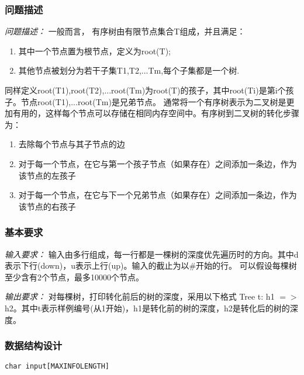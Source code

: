 \documentclass[a4paper,11pt]{article}%
\newenvironment{shadedquotation}
 {\begin{shaded*}
  \quoting[leftmargin=0pt, vskip=0pt]
 }
 {\endquoting
 \end{shaded*}
}
\begin{document}
\subsubsection{问题描述}
\begin{shadedquotation}
    \emph{问题描述：}
    一般而言， 有序树由有限节点集合T组成，并且满足：
    \begin{enumerate}
        \item 其中一个节点置为根节点，定义为root(T);
        \item 其他节点被划分为若干子集T1,T2,...Tm,每个子集都是一个树.
    \end{enumerate}
同样定义root(T1),root(T2),...root(Tm)为root(T)的孩子，其中root(Ti)是第i个孩子。节点root(T1),...root(Tm)是兄弟节点。
通常将一个有序树表示为二叉树是更加有用的，这样每个节点可以存储在相同内存空间中。有序树到二叉树的转化步骤为：
\begin{enumerate}
    \item 去除每个节点与其子节点的边
    \item 对于每一个节点，在它与第一个孩子节点（如果存在）之间添加一条边，作为该节点的左孩子
    \item 对于每一个节点，在它与下一个兄弟节点（如果存在）之间添加一条边，作为该节点的右孩子
\end{enumerate}
\end{shadedquotation}
\subsubsection{基本要求}
\begin{shadedquotation}
    \emph{输入要求：}
    输入由多行组成，每一行都是一棵树的深度优先遍历时的方向。其中d表示下行(down)，u表示上行(up)。输入的截止为以\#开始的行。
可以假设每棵树至少含有2个节点，最多10000个节点。
\end{shadedquotation}
\begin{shadedquotation}
    \emph{输出要求：}
    对每棵树，打印转化前后的树的深度，采用以下格式 Tree t: h1 $=>$ h2。其中t表示样例编号(从1开始)，h1是转化前的树的深度，h2是转化后的树的深度。
\end{shadedquotation}
\subsubsection{数据结构设计}
\begin{lstlisting}[language={[ANSI]C},keywordstyle=\color{blue!70},commentstyle=\color{red!50!green!50!blue!50},frame=shadowbox,
				rulesepcolor=\color{red!20!green!20!blue!20}]
char input[MAXINFOLENGTH]
\end{lstlisting}
\end{document}
